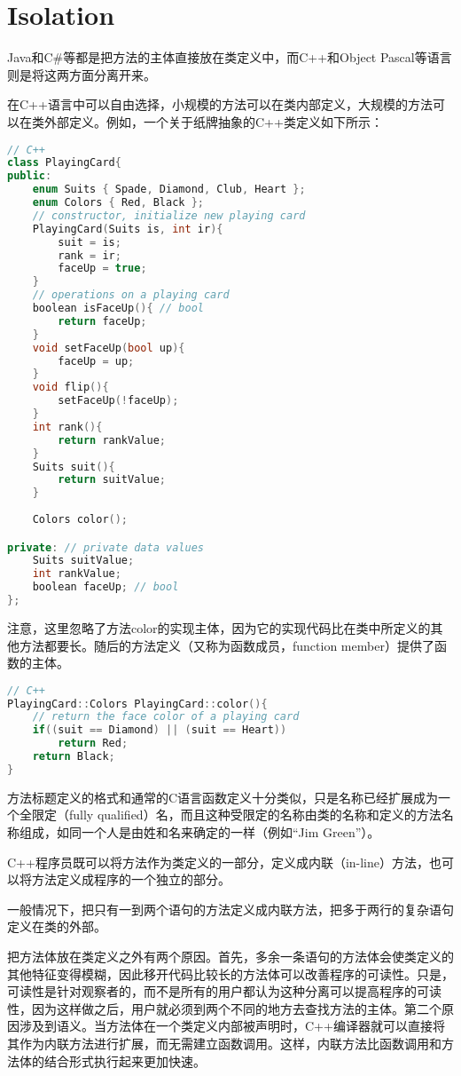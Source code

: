 \section{Isolation}

Java和C\#等都是把方法的主体直接放在类定义中，而C++和Object Pascal等语言则是将这两方面分离开来。

在C++语言中可以自由选择，小规模的方法可以在类内部定义，大规模的方法可以在类外部定义。例如，一个关于纸牌抽象的C++类定义如下所示：

\begin{lstlisting}[language=C++]
// C++ 
class PlayingCard{
public:
	enum Suits { Spade, Diamond, Club, Heart };
	enum Colors { Red, Black };
	// constructor, initialize new playing card
	PlayingCard(Suits is, int ir){
		suit = is;
		rank = ir;
		faceUp = true;
	}
	// operations on a playing card
	boolean isFaceUp(){ // bool
		return faceUp;
	}
	void setFaceUp(bool up){
		faceUp = up;
	}
	void flip(){
		setFaceUp(!faceUp);
	}
	int rank(){
		return rankValue;
	}
	Suits suit(){
		return suitValue;
	}
	
	Colors color();

private: // private data values
	Suits suitValue;
	int rankValue;
	boolean faceUp; // bool
};
\end{lstlisting}

注意，这里忽略了方法color的实现主体，因为它的实现代码比在类中所定义的其他方法都要长。随后的方法定义（又称为函数成员，function member）提供了函数的主体。


\begin{lstlisting}[language=C++]
// C++
PlayingCard::Colors PlayingCard::color(){
	// return the face color of a playing card
	if((suit == Diamond) || (suit == Heart))
		return Red;
	return Black;
}
\end{lstlisting}

方法标题定义的格式和通常的C语言函数定义十分类似，只是名称已经扩展成为一个全限定（fully qualified）名，而且这种受限定的名称由类的名称和定义的方法名称组成，如同一个人是由姓和名来确定的一样（例如“Jim Green”）。

C++程序员既可以将方法作为类定义的一部分，定义成内联（in-line）方法，也可以将方法定义成程序的一个独立的部分。

一般情况下，把只有一到两个语句的方法定义成内联方法，把多于两行的复杂语句定义在类的外部。



把方法体放在类定义之外有两个原因。首先，多余一条语句的方法体会使类定义的其他特征变得模糊，因此移开代码比较长的方法体可以改善程序的可读性。只是，可读性是针对观察者的，而不是所有的用户都认为这种分离可以提高程序的可读性，因为这样做之后，用户就必须到两个不同的地方去查找方法的主体。第二个原因涉及到语义。当方法体在一个类定义内部被声明时，C++编译器就可以直接将其作为内联方法进行扩展，而无需建立函数调用。这样，内联方法比函数调用和方法体的结合形式执行起来更加快速。


